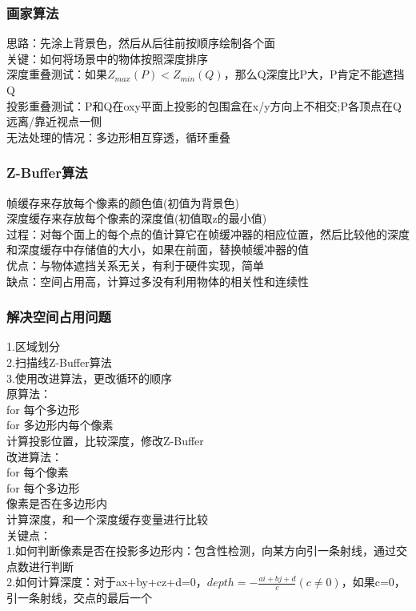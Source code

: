 \documentclass{article}
\begin{document}
\begin{CJK}{UTF8}{gbsn}
	\subsubsection{画家算法}
	思路：先涂上背景色，然后从后往前按顺序绘制各个面\\
	关键：如何将场景中的物体按照深度排序\\
	深度重叠测试：如果$Z_{max}(P)<Z_{min}(Q)$，那么Q深度比P大，P肯定不能遮挡Q\\
	投影重叠测试：P和Q在oxy平面上投影的包围盒在x/y方向上不相交;P各顶点在Q远离/靠近视点一侧\\
	无法处理的情况：多边形相互穿透，循环重叠\\
	\subsubsection{Z-Buffer算法}
	帧缓存来存放每个像素的颜色值(初值为背景色)\\
	深度缓存来存放每个像素的深度值(初值取z的最小值)\\
	过程：对每个面上的每个点的值计算它在帧缓冲器的相应位置，然后比较他的深度和深度缓存中存储值的大小，如果在前面，替换帧缓冲器的值\\
	优点：与物体遮挡关系无关，有利于硬件实现，简单\\
	缺点：空间占用高，计算过多没有利用物体的相关性和连续性\\
	\subsubsection{解决空间占用问题}
	1.区域划分\\
	2.扫描线Z-Buffer算法\\
	3.使用改进算法，更改循环的顺序\\
	原算法：\\
	for 每个多边形\\
	for 多边形内每个像素\\
	计算投影位置，比较深度，修改Z-Buffer\\
	改进算法：\\
	for 每个像素\\
	for 每个多边形\\
	像素是否在多边形内\\
	计算深度，和一个深度缓存变量进行比较\\
	关键点：\\
	1.如何判断像素是否在投影多边形内：包含性检测，向某方向引一条射线，通过交点数进行判断\\
	2.如何计算深度：对于ax+by+cz+d=0，$depth=-\frac{ai+bj+d}{c}(c\neq 0)$，如果c=0，引一条射线，交点的最后一个\\
	

\end{CJK}
\end{document}
